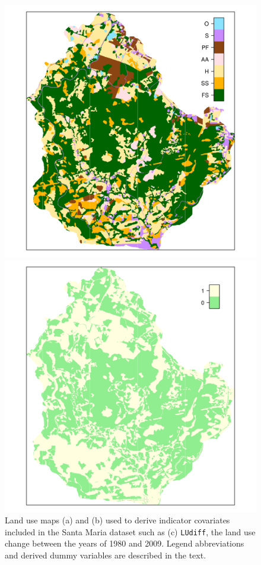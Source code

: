\begin{figure}[!ht]
\begin{minipage}[b]{0.45\textwidth}
\includegraphics[width = \textwidth]{fig/chap05-land-new}
\end{minipage}
\begin{minipage}[b]{0.45\textwidth}
\subcaption{}
\centering
\includegraphics[width = \textwidth]{fig/chap05-land-diff}
\end{minipage}
\caption[Land use maps included in the Santa Maria dataset.]{Land use maps (a) \landOld{} and (b) \landNew{} 
used to derive indicator covariates included in the Santa Maria dataset such as (c) \texttt{LUdiff}, the land 
use change between the years of 1980 and 2009. Legend abbreviations and derived dummy variables are described 
in the text.}
\label{fig:chap05-land-use}
\end{figure}

